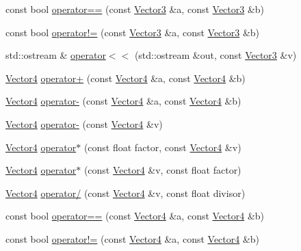 \begin{DoxyCompactItemize}
\item 
const bool \hyperlink{namespaceprism_a2fc2a483f2e3ec622ad2c0ac9699fbcb}{operator==} (const \hyperlink{classprism_1_1_vector3}{Vector3} \&a, const \hyperlink{classprism_1_1_vector3}{Vector3} \&b)
\item 
const bool \hyperlink{namespaceprism_aa752c5d0210902dece31c2fcfc98a824}{operator!=} (const \hyperlink{classprism_1_1_vector3}{Vector3} \&a, const \hyperlink{classprism_1_1_vector3}{Vector3} \&b)
\item 
std\+::ostream \& \hyperlink{namespaceprism_aa7b9367a483153af865552ba486f1196}{operator$<$$<$} (std\+::ostream \&out, const \hyperlink{classprism_1_1_vector3}{Vector3} \&v)
\item 
\hyperlink{classprism_1_1_vector4}{Vector4} \hyperlink{namespaceprism_a4ac9ebc0ce1449793eb8f521c64929a9}{operator+} (const \hyperlink{classprism_1_1_vector4}{Vector4} \&a, const \hyperlink{classprism_1_1_vector4}{Vector4} \&b)
\item 
\hyperlink{classprism_1_1_vector4}{Vector4} \hyperlink{namespaceprism_a038a64f530d1c50bf72cf1a23886ecca}{operator-\/} (const \hyperlink{classprism_1_1_vector4}{Vector4} \&a, const \hyperlink{classprism_1_1_vector4}{Vector4} \&b)
\item 
\hyperlink{classprism_1_1_vector4}{Vector4} \hyperlink{namespaceprism_a147712ae50c37618cbc61f20efe6729f}{operator-\/} (const \hyperlink{classprism_1_1_vector4}{Vector4} \&v)
\item 
\hyperlink{classprism_1_1_vector4}{Vector4} \hyperlink{namespaceprism_aa652a61fe96302693aa0279e832360c7}{operator$\ast$} (const float factor, const \hyperlink{classprism_1_1_vector4}{Vector4} \&v)
\item 
\hyperlink{classprism_1_1_vector4}{Vector4} \hyperlink{namespaceprism_ab3b4a59d9247143b49db3c2778838895}{operator$\ast$} (const \hyperlink{classprism_1_1_vector4}{Vector4} \&v, const float factor)
\item 
\hyperlink{classprism_1_1_vector4}{Vector4} \hyperlink{namespaceprism_a4aa2b9a75c3d5134fc80cc6afc1be443}{operator/} (const \hyperlink{classprism_1_1_vector4}{Vector4} \&v, const float divisor)
\item 
const bool \hyperlink{namespaceprism_a80bdef743a64c754bf1a2b217c82f60a}{operator==} (const \hyperlink{classprism_1_1_vector4}{Vector4} \&a, const \hyperlink{classprism_1_1_vector4}{Vector4} \&b)
\item 
const bool \hyperlink{namespaceprism_a1ffa413af039c2bff07202dcfce55f05}{operator!=} (const \hyperlink{classprism_1_1_vector4}{Vector4} \&a, const \hyperlink{classprism_1_1_vector4}{Vector4} \&b)

\end{DoxyCompactItemize}
